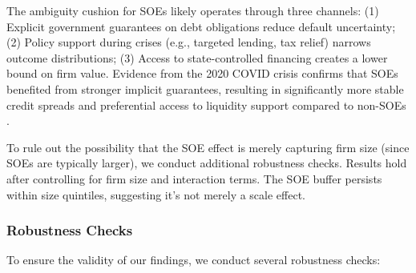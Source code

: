 \documentclass[preprint,12pt,authoryear]{elsarticle}
\begin{document}
 The ambiguity cushion for SOEs likely operates through three channels: (1) Explicit government guarantees on debt obligations reduce default uncertainty; (2) Policy support during crises (e.g., targeted lending, tax relief) narrows outcome distributions; (3) Access to state-controlled financing creates a lower bound on firm value. Evidence from the 2020 COVID crisis confirms that SOEs benefited from stronger implicit guarantees, resulting in significantly more stable credit spreads and preferential access to liquidity support compared to non-SOEs \citep{AllianzTrade2021}.
  
  To rule out the possibility that the SOE effect is merely capturing firm size (since SOEs are typically larger), we conduct additional robustness checks. Results hold after controlling for firm size and interaction terms. The SOE buffer persists within size quintiles, suggesting it's not merely a scale effect.

\subsubsection{Robustness Checks}
\label{sec:robustness}

To ensure the validity of our findings, we conduct several robustness checks:
\end{document}

